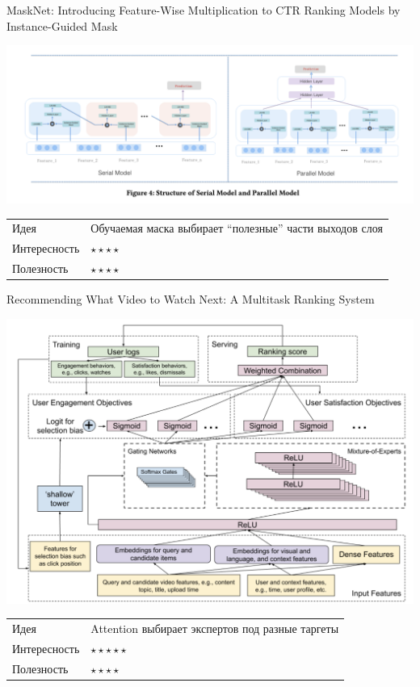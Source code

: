 \documentclass[11pt,aspectratio=169,handout]{beamer}
\begin{document}
\begin{frame}{MaskNet: Introducing Feature-Wise Multiplication to CTR Ranking Models by Instance-Guided Mask \cite{MASKNET}}

\begin{center}
\includegraphics[scale=0.3]{images/mask-arch.png}
\end{center}

\vfill
\begin{small}
\begin{tabular}{l l}
Идея & Обучаемая маска выбирает ``полезные'' части выходов слоя \\
Интересность & $\star\star\star\star$ \\
Полезность & $\star\star\star\star$
\end{tabular}
\end{small}

\end{frame}

\begin{frame}{Recommending What Video to Watch Next: A Multitask Ranking System \cite{RANKING}}

\begin{center}
\includegraphics[scale=0.2]{images/multitask.png}
\end{center}

\vfill
\begin{small}
\begin{tabular}{l l}
Идея & Attention выбирает экспертов под разные таргеты \\
Интересность & $\star\star\star\star\star$ \\
Полезность & $\star\star\star\star$
\end{tabular}
\end{small}

\end{frame}
\end{document}
